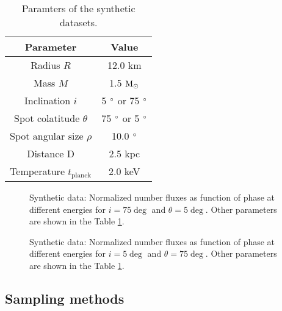 \documentclass{wihuri}
\def\msun{{\rm M_{\odot}}}
\begin{document}
\begin{center}
\begin{table}
  \caption{Paramters of the synthetic datasets.}
\label{table:params}
\begin{center}
  \begin{tabular}{| c | c |}
    \hline
     Parameter & Value\\ \hline
      Radius $R$ & 12.0 km  \\ \hline
      Mass $M$ & 1.5 $\msun$  \\ \hline
      Inclination $i$ & 5 $\degree$ or 75 $\degree$ \\ \hline
      Spot colatitude $\theta$ & 75 $\degree$ or 5 $\degree$ \\ \hline
      Spot angular size $\rho$ & 10.0 $\degree$  \\ \hline
      Distance D & 2.5 kpc \\ \hline
      Temperature $t_{\mathrm{planck}}$ & 2.0 keV \\

    \hline
  \end{tabular}
  \end{center} 

  \end{table}
\end{center} 



%



\begin{figure}
\centerline{}
\caption{Synthetic data: Normalized number fluxes as function of phase at different energies for $i = 75 \deg$ and $\theta = 5 \deg$. Other parameters are shown in the Table \ref{table:params}.
\label{fig:syntpol2}}
\end{figure}


\begin{figure}
\centerline{}
\caption{Synthetic data: Normalized number fluxes as function of phase at different energies for $i = 5 \deg$ and $\theta = 75 \deg$. Other parameters are shown in the Table \ref{table:params}.
\label{fig:synteq2}}
\end{figure}


\subsection{Sampling methods}
\end{document}
